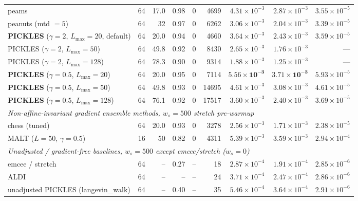 \documentclass{article}
\begin{document}
\begin{table}[t]
\begin{tabular}{l rrrr rrrr}
peams                         & 64 & 17.0 & 0.98 & 0 & 4699 & $4.31\!\times\!10^{-3}$ & $2.87\!\times\!10^{-3}$ & $3.55\!\times\!10^{-5}$ \\
peanuts (mtd $=5$)            & 64 & 32   & 0.97 & 0 & 6262 & $3.06\!\times\!10^{-3}$ & $2.04\!\times\!10^{-3}$ & $3.39\!\times\!10^{-5}$ \\
\textbf{PICKLES} ($\gamma{=}2$, $L_{\max}{=}20$, default) & 64 & 20.0 & 0.94 & 0 & 4660 & $3.64\!\times\!10^{-3}$ & $2.43\!\times\!10^{-3}$ & $3.59\!\times\!10^{-5}$ \\
PICKLES ($\gamma{=}2$, $L_{\max}{=}50$) & 64 & 49.8 & 0.92 & 0 & 8430 & $2.65\!\times\!10^{-3}$ & $1.76\!\times\!10^{-3}$ & --- \\
PICKLES ($\gamma{=}2$, $L_{\max}{=}128$) & 64 & 78.3 & 0.90 & 0 & 9314 & $1.88\!\times\!10^{-3}$ & $1.25\!\times\!10^{-3}$ & --- \\
\textbf{PICKLES} ($\gamma{=}0.5$, $L_{\max}{=}20$) & 64 & 20.0 & 0.95 & 0 & 7114 & $\boldsymbol{5.56\!\times\!10^{-3}}$ & $\boldsymbol{3.71\!\times\!10^{-3}}$ & $5.93\!\times\!10^{-5}$ \\
\textbf{PICKLES} ($\gamma{=}0.5$, $L_{\max}{=}50$) & 64 & 49.8 & 0.93 & 0 & 14695 & $4.61\!\times\!10^{-3}$ & $3.08\!\times\!10^{-3}$ & $4.61\!\times\!10^{-5}$ \\
\textbf{PICKLES} ($\gamma{=}0.5$, $L_{\max}{=}128$) & 64 & 76.1 & 0.92 & 0 & 17517 & $3.60\!\times\!10^{-3}$ & $2.40\!\times\!10^{-3}$ & $3.69\!\times\!10^{-5}$ \\
\midrule
\multicolumn{9}{l}{\emph{Non-affine-invariant gradient ensemble methods,  $w_s = 500$ stretch pre-warmup}} \\
chess (tuned)                 & 64 & 20.0 & 0.93 & 0 & 3278 & $2.56\!\times\!10^{-3}$ & $1.71\!\times\!10^{-3}$ & $2.38\!\times\!10^{-5}$ \\
MALT ($L{=}50$, $\gamma{=}0.5$)& 16 & 50   & 0.82 & 0 & 4311 & $5.39\!\times\!10^{-3}$ & $3.59\!\times\!10^{-3}$ & $2.94\!\times\!10^{-4}$ \\
\midrule
\multicolumn{9}{l}{\emph{Unadjusted / gradient-free baselines, $w_s = 500$ except emcee/stretch ($w_s = 0$)}} \\
emcee / stretch               & 64 & --   & 0.27 & -- & 18 & $2.87\!\times\!10^{-4}$ & $1.91\!\times\!10^{-4}$ & $2.85\!\times\!10^{-6}$ \\
ALDI                          & 64 & --   & --   & -- & 24 & $3.71\!\times\!10^{-4}$ & $2.47\!\times\!10^{-4}$ & $2.86\!\times\!10^{-6}$ \\
unadjusted PICKLES (langevin\_walk) & 64 & -- & 0.40 & -- & 35 & $5.46\!\times\!10^{-4}$ & $3.64\!\times\!10^{-4}$ & $2.91\!\times\!10^{-6}$ \\

\end{tabular}
\end{table}
\end{document}
